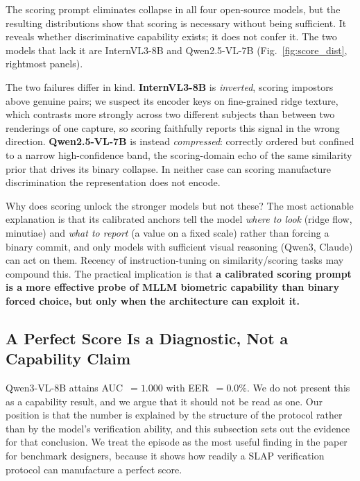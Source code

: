 \documentclass[runningheads]{llncs}
\begin{document}
The scoring prompt eliminates collapse in all four open-source models, but
the resulting distributions show that scoring is necessary without being
sufficient. It reveals whether discriminative capability exists; it does
not confer it. The two models that lack it are InternVL3-8B and
Qwen2.5-VL-7B (Fig.~\ref{fig:score_dist}, rightmost panels).

The two failures differ in kind. \textbf{InternVL3-8B} is \emph{inverted},
scoring impostors above genuine pairs; we suspect its encoder keys on
fine-grained ridge texture, which contrasts more strongly across two
different subjects than between two renderings of one capture, so scoring
faithfully reports this signal in the wrong direction. \textbf{Qwen2.5-VL-7B}
is instead \emph{compressed}: correctly ordered but confined to a narrow
high-confidence band, the scoring-domain echo of the same similarity prior
that drives its binary collapse. In neither case can scoring manufacture
discrimination the representation does not encode.

Why does scoring unlock the stronger models but not these? The most
actionable explanation is that its calibrated anchors tell the model
\emph{where to look} (ridge flow, minutiae) and \emph{what to report}
(a value on a fixed scale) rather than forcing a binary commit, and only
models with sufficient visual reasoning (Qwen3, Claude) can act on them.
Recency of instruction-tuning on similarity/scoring tasks may compound this.
The practical implication is that \textbf{a calibrated scoring prompt is a
more effective probe of MLLM biometric capability than binary forced choice,
but only when the architecture can exploit it.}

\subsection{A Perfect Score Is a Diagnostic, Not a Capability Claim}
\label{sec:perfect}

Qwen3-VL-8B attains AUC~$= 1.000$ with EER~$= 0.0\%$. We do not present
this as a capability result, and we argue that it should not be read as
one. Our position is that the number is explained by the structure of the
protocol rather than by the model's verification ability, and this
subsection sets out the evidence for that conclusion. We treat the episode
as the most useful finding in the paper for benchmark designers, because it
shows how readily a SLAP verification protocol can manufacture a perfect
score.
\end{document}

